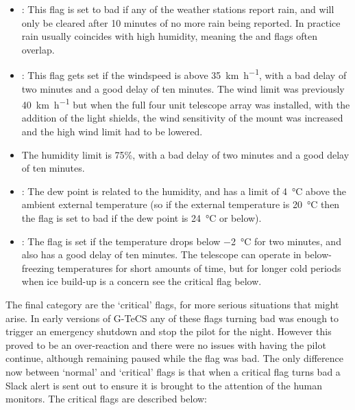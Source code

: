 \begin{colsection}
\begin{colsection}
\begin{itemize}
    \item {}: This flag is set to bad if any of the weather stations report rain, and will only be cleared after 10 minutes of no more rain being reported. In practice rain usually coincides with high humidity, meaning the  and  flags often overlap.

    \item {}: This flag gets set if the windspeed is above \SI{35}{\kilo\meter\per\hour}, with a bad delay of two minutes and a good delay of ten minutes. The wind limit was previously \SI{40}{\kilo\metre\per\hour} but when the full four unit telescope array was installed, with the addition of the light shields, the wind sensitivity of the mount was increased and the high wind limit had to be lowered.

    \item {} The humidity limit is 75\%, with a bad delay of two minutes and a good delay of ten minutes.

    \item {}: The dew point is related to the humidity, and has a limit of \SI{4}{\celsius} above the ambient external temperature (so if the external temperature is \SI{20}{\celsius} then the flag is set to bad if the dew point is \SI{24}{\celsius} or below).

    \item {}: The  flag is set if the temperature drops below \SI{-2}{\celsius} for two minutes, and also has a good delay of ten minutes. The telescope can operate in below-freezing temperatures for short amounts of time, but for longer cold periods when ice build-up is a concern see the critical  flag below.

\end{itemize}

The final category are the `critical' flags, for more serious situations that might arise. In early versions of G-TeCS any of these flags turning bad was enough to trigger an emergency shutdown and stop the pilot for the night. However this proved to be an over-reaction and there were no issues with having the pilot continue, although remaining paused while the flag was bad. The only difference now between `normal' and `critical' flags is that when a critical flag turns bad a Slack alert is sent out to ensure it is brought to the attention of the human monitors. The critical flags are described below:


\end{colsection}
\end{colsection}
